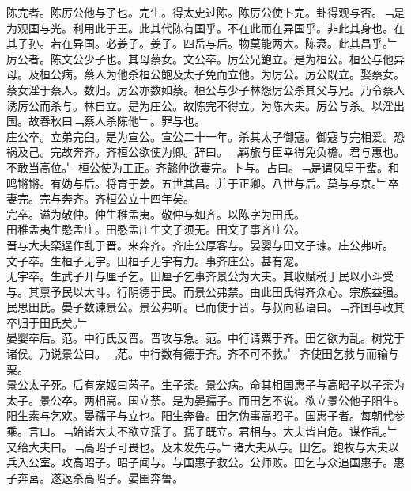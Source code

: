 \documentclass{zhvt-classic}
\begin{document}

\hspace*{2em}陈完者。陈厉公他与子也。完生。得太史过陈。陈厉公使卜完。卦得观与否。﹁是为观国与光。利用此于王。此其代陈有国乎。不在此而在异国乎。非此其身也。在其子孙。若在异国。必姜子。姜子。四岳与后。物莫能两大。陈衰。此其昌乎。﹂\\
\hspace*{2em}厉公者。陈文公少子也。其母蔡女。文公卒。厉公兄鲍立。是为桓公。桓公与他异母。及桓公病。蔡人为他杀桓公鲍及太子免而立他。为厉公。厉公既立。娶蔡女。蔡女淫于蔡人。数归。厉公亦数如蔡。桓公与少子林怨厉公杀其父与兄。乃令蔡人诱厉公而杀与。林自立。是为庄公。故陈完不得立。为陈大夫。厉公与杀。以淫出国。故春秋曰﹁蔡人杀陈他﹂。罪与也。\\
\hspace*{2em}庄公卒。立弟完臼。是为宣公。宣公二十一年。杀其太子御寇。御寇与完相爱。恐祸及己。完故奔齐。齐桓公欲使为卿。辞曰。﹁羁旅与臣幸得免负檐。君与惠也。不敢当高位。﹂桓公使为工正。齐懿仲欲妻完。卜与。占曰。﹁是谓凤皇于蜚。和鸣锵锵。有妫与后。将育于姜。五世其昌。并于正卿。八世与后。莫与与京。﹂卒妻完。完与奔齐。齐桓公立十四年矣。\\
\hspace*{2em}完卒。谥为敬仲。仲生稚孟夷。敬仲与如齐。以陈字为田氏。\\
\hspace*{2em}田稚孟夷生愍孟庄。田愍孟庄生文子须无。田文子事齐庄公。\\
\hspace*{2em}晋与大夫栾逞作乱于晋。来奔齐。齐庄公厚客与。晏婴与田文子谏。庄公弗听。\\
\hspace*{2em}文子卒。生桓子无宇。田桓子无宇有力。事齐庄公。甚有宠。\\
\hspace*{2em}无宇卒。生武子开与厘子乞。田厘子乞事齐景公为大夫。其收赋税于民以小斗受与。其禀予民以大斗。行阴德于民。而景公弗禁。由此田氏得齐众心。宗族益强。民思田氏。晏子数谏景公。景公弗听。已而使于晋。与叔向私语曰。﹁齐国与政其卒归于田氏矣。﹂\\
\hspace*{2em}晏婴卒后。范。中行氏反晋。晋攻与急。范。中行请粟于齐。田乞欲为乱。树党于诸侯。乃说景公曰。﹁范。中行数有德于齐。齐不可不救。﹂齐使田乞救与而输与粟。\\
\hspace*{2em}景公太子死。后有宠姬曰芮子。生子荼。景公病。命其相国惠子与高昭子以子荼为太子。景公卒。两相高。国立荼。是为晏孺子。而田乞不说。欲立景公他子阳生。阳生素与乞欢。晏孺子与立也。阳生奔鲁。田乞伪事高昭子。国惠子者。每朝代参乘。言曰。﹁始诸大夫不欲立孺子。孺子既立。君相与。大夫皆自危。谋作乱。﹂又绐大夫曰。﹁高昭子可畏也。及未发先与。﹂诸大夫从与。田乞。鲍牧与大夫以兵入公室。攻高昭子。昭子闻与。与国惠子救公。公师败。田乞与众追国惠子。惠子奔莒。遂返杀高昭子。晏圉奔鲁。\\
\end{document}
